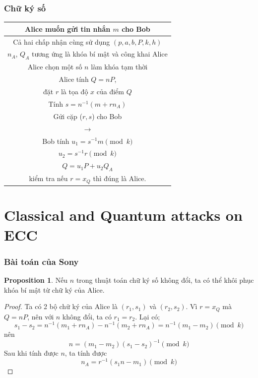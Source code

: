 \documentclass [xcolor=svgnames, t] {beamer}
\theoremstyle{definition}
\newtheorem{proposition}[theorem]{Proposition}
\begin{document}
\begin{frame}
    \frametitle{Chữ ký số}
    \begin{center}
        \fontsize{10pt}{12pt}

        \begin{tabular}{|c|}
            \hline
            Alice muốn gửi tin nhắn $m$ cho Bob                      \\
            \hline
            Cả hai chấp nhận cùng sử dụng $(p, a, b, P, k, h)$       \\
            \hline
            $n_A$, $Q_A$ tương ứng là khóa bí mật và công khai Alice \\
            \hline
            \hline
            Alice chọn một số $n$ làm khóa tạm thời                  \\
            \hline
            Alice tính $Q = nP$,                                     \\
            đặt $r$ là tọa độ $x$ của điểm $Q$                       \\
            Tính $s = n^{-1}(m+ rn_A)$                               \\
            Gửi cặp ($r, s$) cho Bob                                 \\
            $\longrightarrow$                                        \\
            \hline
            Bob tính $u_1 = s^{-1}m \pmod{k}$                        \\
            $u_2 = s^{-1}r \pmod{k}$                                 \\
            $Q = u_1P + u_2Q_A$                                      \\
            kiểm tra nếu $r = x_Q$ thì đúng là Alice.                \\
            \hline
        \end{tabular}

    \end{center}


\end{frame}
\section{Classical and Quantum attacks on ECC}
\begin{frame}
    \frametitle{Bài toán của Sony}
    \begin{proposition}
        \label{pro:4.1}
        Nếu $n$ trong thuật toán chữ ký số không đổi, ta có thể khôi phục khóa bí mật từ chữ ký của Alice.
    \end{proposition}
    \begin{proof}
        Ta có 2 bộ chữ ký của Alice là $(r_1, s_1)$ và $(r_2, s_2)$.
        Vì $r = x_Q$ mà $Q = nP$, nên với $n$ không đổi, ta có $r_1 = r_2$.
        Lại có;
        $$ s_1 - s_2 = n^{-1}(m_1+rn_A) - n^{-1}(m_2+rn_A) = n^{-1}(m_1-m_2) \pmod{k}$$
        nên $$ n = (m_1 - m_2)(s_1 - s_2)^{-1} \pmod{k}$$
        Sau khi tính được $n$, ta tính được $$n_A = r^{-1}(s_1n-m_1) \pmod{k}$$
    \end{proof}
\end{frame}
\end{document}
